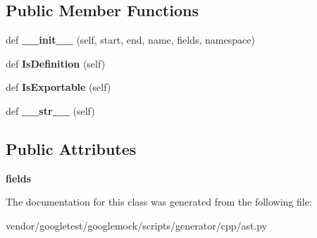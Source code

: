\subsection*{Public Member Functions}
\begin{DoxyCompactItemize}
\item 
\mbox{\label{classcpp_1_1ast_1_1___nested_type_a63acff60f38885be6cc11231fffc3f4e}} 
def {\bfseries \+\_\+\+\_\+init\+\_\+\+\_\+} (self, start, end, name, fields, namespace)
\item 
\mbox{\label{classcpp_1_1ast_1_1___nested_type_a9f160999863f39c9032f60b014e213d5}} 
def {\bfseries Is\+Definition} (self)
\item 
\mbox{\label{classcpp_1_1ast_1_1___nested_type_a689f8b0dc20e6070938825eee483dd2f}} 
def {\bfseries Is\+Exportable} (self)
\item 
\mbox{\label{classcpp_1_1ast_1_1___nested_type_a18901ec6acba88c526d703444bf4d52c}} 
def {\bfseries \+\_\+\+\_\+str\+\_\+\+\_\+} (self)
\end{DoxyCompactItemize}
\subsection*{Public Attributes}
\begin{DoxyCompactItemize}
\item 
\mbox{\label{classcpp_1_1ast_1_1___nested_type_aed69c37a409b4d26e6cfde2de3185d86}} 
{\bfseries fields}
\end{DoxyCompactItemize}


The documentation for this class was generated from the following file\+:\begin{DoxyCompactItemize}
\item 
vendor/googletest/googlemock/scripts/generator/cpp/ast.\+py\end{DoxyCompactItemize}
